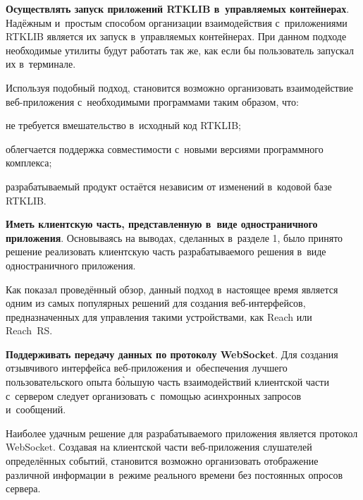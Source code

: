 \begin{dashitemize}
  \item \textbf{Осуществлять запуск приложений RTKLIB в~управляемых контейнерах}. Надёжным и~простым способом организации взаимодействия с~приложениями RTKLIB является их запуск в~управляемых контейнерах. При данном подходе необходимые утилиты будут работать так же, как если бы пользователь запускал их в~терминале. \par

  Используя подобный подход, становится возможно организовать взаимодействие веб-приложения с~необходимыми программами таким образом, что:

  \begin{dashitemize}
    \item не требуется вмешательство в~исходный код RTKLIB;
    \item облегчается поддержка совместимости с~новыми версиями программного комплекса;
    \item разрабатываемый продукт остаётся независим от изменений в~кодовой базе RTKLIB. 
  \end{dashitemize}

  \item \textbf{Иметь клиентскую часть, представленную в~виде одностраничного приложения}. Основываясь на выводах, сделанных в~разделе 1, было принято решение реализовать клиентскую часть разрабатываемого решения в~виде одностраничного приложения. \par

  Как показал проведённый обзор, данный подход в~настоящее время является одним из самых популярных решений для создания веб-интерфейсов, предназначенных для управления такими устройствами, как Reach или Reach~RS.

  \item \textbf{Поддерживать передачу данных по протоколу WebSocket}. Для создания отзывчивого интерфейса веб-приложения и~обеспечения лучшего пользовательского опыта б\`{о}льшую часть взаимодействий клиентской части с~сервером следует организовать с~помощью асинхронных запросов и~сообщений. \par

  Наиболее удачным решение для разрабатываемого приложения является протокол WebSocket. Создавая на клиентской части веб-приложения слушателей определённых событий, становится возможно организовать отображение различной информации в~режиме реального времени без постоянных опросов сервера.
\end{dashitemize}

